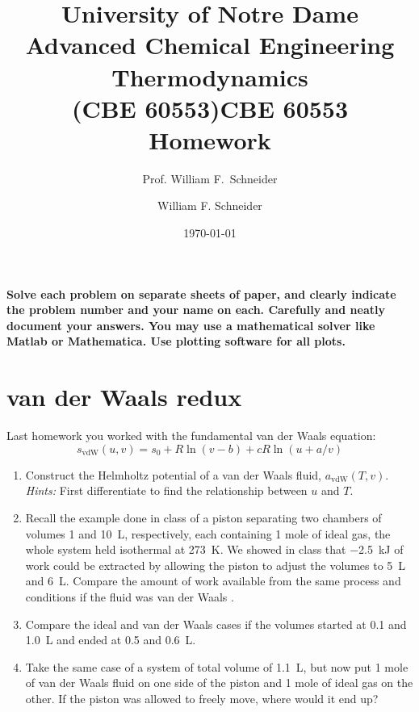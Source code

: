 \documentclass[11pt]{article}
\title{University of Notre Dame\\Advanced Chemical Engineering Thermodynamics\\(CBE 60553)}
\author{Prof. William F.\ Schneider}
\author{William F. Schneider}
\date{\today}
\title{CBE 60553 Homework}
\begin{document}
\begin{OPTIONS}
\end{OPTIONS}

\noindent \textbf{Solve each problem on separate sheets of paper, and clearly indicate the problem number and your name on each.  Carefully and neatly document your answers.  You may use a mathematical solver like Matlab or Mathematica. Use plotting software for all plots.}

\section{van der Waals  redux}
\label{sec:org85ce388}
Last homework you worked with the fundamental van der Waals equation:
\begin{equation}
s_\text{vdW}(u,v)=s_{0}+R\ln\left (v-b\right ) +c R \ln \left ( u+a/v \right )
\end{equation}
\begin{enumerate}
\item Construct the Helmholtz potential of a van der Waals fluid,
\(a_\text{vdW}(T,v)\).  \emph{Hints:} First differentiate to find the
relationship between \(u\) and \(T\).

\item Recall the example done in class of a piston separating two chambers of volumes 1 and
\SI{10}{L}, respectively, each containing 1 mole of ideal gas, the whole system held isothermal at
\SI{273}{K}.  We showed in class that \SI{-2.5}{kJ} of work could be extracted by allowing
the piston to adjust the volumes to \SI{5}{L} and \SI{6}{L}.  Compare the amount of work available
from the same process and conditions if the fluid was van der Waals .

\item Compare the ideal and van der Waals  cases if the volumes started at 0.1 and
\SI{1.0}{L} and ended at 0.5 and \SI{0.6}{L}.

\item Take the same case of a system of total volume of \SI{1.1}{L}, but now put 1 mole of van
der Waals  fluid on one side of the piston and 1 mole of ideal gas on the other.  If
the piston was allowed to freely move, where would it end up?
\end{enumerate}
\end{document}
